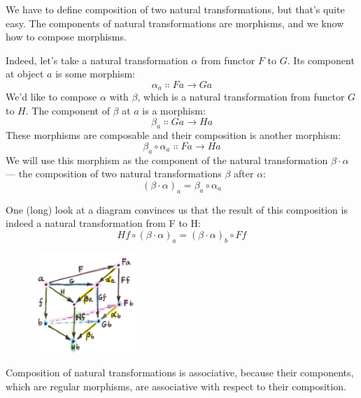 We have to define composition of two natural transformations, but that's
quite easy. The components of natural transformations are morphisms, and
we know how to compose morphisms.

Indeed, let's take a natural transformation $\alpha$ from functor $F$ to $G$. Its
component at object $a$ is some morphism:
\[\alpha_a \Colon F a \to G a\]
We'd like to compose $\alpha$ with $\beta$, which is a natural transformation from
functor $G$ to $H$. The component of $\beta$ at $a$ is a morphism:
\[\beta_a \Colon G a \to H a\]
These morphisms are composable and their composition is another
morphism:
\[\beta_a \circ \alpha_a \Colon F a \to H a\]
We will use this morphism as the component of the natural transformation
$\beta \cdot \alpha$ --- the composition of two natural transformations $\beta$ after $\alpha$:
\[(\beta \cdot \alpha)_a = \beta_a \circ \alpha_a\]

\begin{figure}[H]
\centering
{}
\end{figure}

\noindent
One (long) look at a diagram convinces us that the result of this
composition is indeed a natural transformation from F to H:
\[H f \circ (\beta \cdot \alpha)_a = (\beta \cdot \alpha)_b \circ F f\]

\begin{figure}[H]
\centering
\includegraphics[width=0.35\textwidth]{images/6_verticalnaturality.jpg}
\end{figure}

\noindent
Composition of natural transformations is associative, because their
components, which are regular morphisms, are associative with respect to
their composition.

